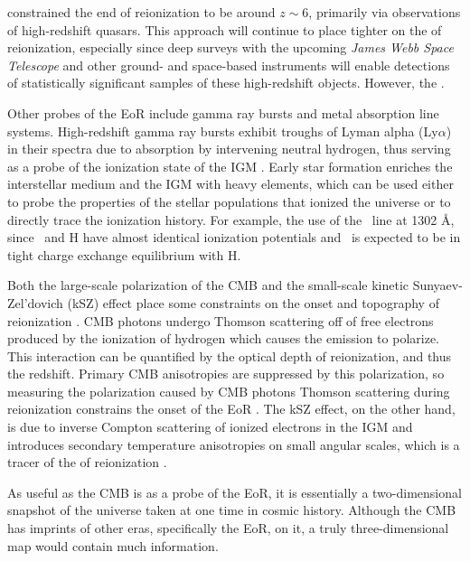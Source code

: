 \documentclass[12pt]{article}
\begin{document}
\cite{fan2006} constrained the end of reionization to be around $z \sim 6$, primarily via observations of high-redshift quasars. This approach will continue to place tighter  on the  of reionization, especially since deep surveys with the upcoming \textit{James Webb Space Telescope} and other ground- and space-based instruments will enable detections of statistically significant samples of these high-redshift objects. However, the .

Other probes of the EoR include gamma ray bursts and metal absorption line systems. High-redshift gamma ray bursts exhibit troughs  of Lyman alpha (Ly$\alpha$) in their spectra due to absorption by intervening neutral hydrogen, thus serving as a probe of the ionization state of the IGM \citep[e.g.,][]{gallerani2008}. Early star formation enriches the interstellar medium and the IGM with heavy elements, which can be used either to probe the properties of the stellar populations that ionized the universe or to directly trace the ionization history. For example, \cite{oh2002}  the use of the \OI~line at 1302 \AA, since \OI~and H have almost identical ionization potentials and \OI~is expected to be in tight charge exchange equilibrium with H.

Both the large-scale polarization of the CMB and the small-scale kinetic Sunyaev-Zel'dovich (kSZ) effect place some constraints on the onset and topography of reionization \citep{fan2006}. CMB photons undergo Thomson scattering off of free electrons produced by the ionization of hydrogen which causes the emission to polarize. This interaction can be quantified by the optical depth of reionization, and thus the redshift. Primary CMB anisotropies are suppressed by this polarization, so measuring the polarization caused by CMB photons Thomson scattering during reionization constrains the onset of the EoR \citep[e.g.,][]{zaldarriaga1997, roy2018}. The kSZ effect, on the other hand, is due to inverse Compton scattering of ionized electrons in the IGM and introduces secondary temperature anisotropies on small angular scales, which is a tracer of the  of reionization \citep{fan2006, park2013, roy2018}.

As useful as the CMB is as a probe of the EoR, it is essentially a two-dimensional snapshot of the universe taken at one time in cosmic history. Although the CMB has imprints of other eras, specifically the EoR, on it, a truly three-dimensional map would contain much information. 
\end{document}
